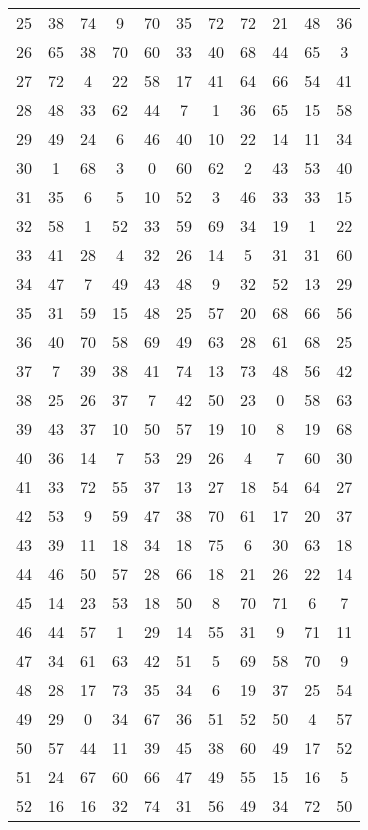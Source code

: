 \begin{table}
\begin{tabular}{c c c c c c c c c c c }
25 & 38 & 74 & 9 & 70 & 35 & 72 & 72 & 21 & 48 & 36 \\
26 & 65 & 38 & 70 & 60 & 33 & 40 & 68 & 44 & 65 & 3 \\
27 & 72 & 4 & 22 & 58 & 17 & 41 & 64 & 66 & 54 & 41 \\
28 & 48 & 33 & 62 & 44 & 7 & 1 & 36 & 65 & 15 & 58 \\
29 & 49 & 24 & 6 & 46 & 40 & 10 & 22 & 14 & 11 & 34 \\
30 & 1 & 68 & 3 & 0 & 60 & 62 & 2 & 43 & 53 & 40 \\
31 & 35 & 6 & 5 & 10 & 52 & 3 & 46 & 33 & 33 & 15 \\
32 & 58 & 1 & 52 & 33 & 59 & 69 & 34 & 19 & 1 & 22 \\
33 & 41 & 28 & 4 & 32 & 26 & 14 & 5 & 31 & 31 & 60 \\
34 & 47 & 7 & 49 & 43 & 48 & 9 & 32 & 52 & 13 & 29 \\
35 & 31 & 59 & 15 & 48 & 25 & 57 & 20 & 68 & 66 & 56 \\
36 & 40 & 70 & 58 & 69 & 49 & 63 & 28 & 61 & 68 & 25 \\
37 & 7 & 39 & 38 & 41 & 74 & 13 & 73 & 48 & 56 & 42 \\
38 & 25 & 26 & 37 & 7 & 42 & 50 & 23 & 0 & 58 & 63 \\
39 & 43 & 37 & 10 & 50 & 57 & 19 & 10 & 8 & 19 & 68 \\
40 & 36 & 14 & 7 & 53 & 29 & 26 & 4 & 7 & 60 & 30 \\
41 & 33 & 72 & 55 & 37 & 13 & 27 & 18 & 54 & 64 & 27 \\
42 & 53 & 9 & 59 & 47 & 38 & 70 & 61 & 17 & 20 & 37 \\
43 & 39 & 11 & 18 & 34 & 18 & 75 & 6 & 30 & 63 & 18 \\
44 & 46 & 50 & 57 & 28 & 66 & 18 & 21 & 26 & 22 & 14 \\
45 & 14 & 23 & 53 & 18 & 50 & 8 & 70 & 71 & 6 & 7 \\
46 & 44 & 57 & 1 & 29 & 14 & 55 & 31 & 9 & 71 & 11 \\
47 & 34 & 61 & 63 & 42 & 51 & 5 & 69 & 58 & 70 & 9 \\
48 & 28 & 17 & 73 & 35 & 34 & 6 & 19 & 37 & 25 & 54 \\
49 & 29 & 0 & 34 & 67 & 36 & 51 & 52 & 50 & 4 & 57 \\
50 & 57 & 44 & 11 & 39 & 45 & 38 & 60 & 49 & 17 & 52 \\
51 & 24 & 67 & 60 & 66 & 47 & 49 & 55 & 15 & 16 & 5 \\
52 & 16 & 16 & 32 & 74 & 31 & 56 & 49 & 34 & 72 & 50 \\

\end{tabular}
\end{table}
